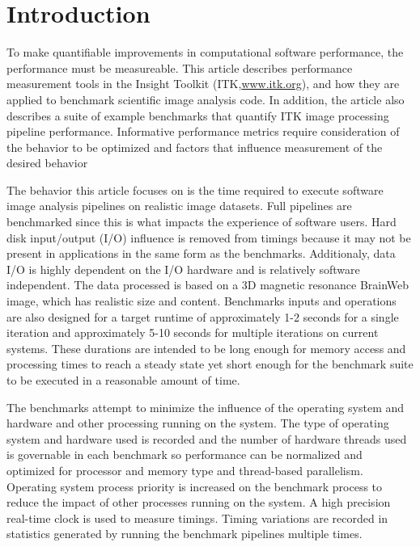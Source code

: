 \documentclass{InsightArticle}
\newcommand{\IJhandlerIDnumber}{1338}
\begin{document}
\IJhandlenote{\IJhandlerIDnumber}

\tableofcontents

\section{Introduction}

To make quantifiable improvements in computational software performance, the
performance must be measureable. This article describes performance
measurement tools in the Insight Toolkit (ITK,\url{www.itk.org}), and how they
are applied to benchmark scientific image analysis code. In addition, the
article also describes a suite of example benchmarks that quantify ITK image
processing pipeline performance. Informative performance metrics require
consideration of the behavior to be optimized and factors that influence
measurement of the desired behavior

The behavior this article focuses on is the time required to execute software
image analysis pipelines on realistic image datasets. Full pipelines are
benchmarked since this is what impacts the experience of software users. Hard
disk input/output (I/O) influence is removed from timings because it may not
be present in applications in the same form as the benchmarks. Additionaly,
data I/O is highly dependent on the I/O hardware and is relatively software
independent. The data processed is based on a 3D magnetic resonance
BrainWeb\cite{BrainWeb1,BrainWeb2} image, which has realistic size and
content. Benchmarks inputs and operations are also designed for a target runtime of
approximately 1-2 seconds for a single iteration and approximately 5-10
seconds for multiple iterations on current systems. These durations are
intended to be long enough for memory access and processing times to reach a
steady state yet short enough for the benchmark suite to be executed in a
reasonable amount of time.

The benchmarks attempt to minimize the influence of the operating system and
hardware and other processing running on the system. The type of operating
system and hardware used is recorded and the number of hardware threads used
is governable in each benchmark so performance can be normalized and optimized
for processor and memory type and thread-based parallelism. Operating system
process priority is increased on the benchmark process to reduce the impact of
other processes running on the system. A high precision real-time clock is
used to measure timings.  Timing variations are recorded in statistics
generated by running the benchmark pipelines multiple times.
\end{document}
